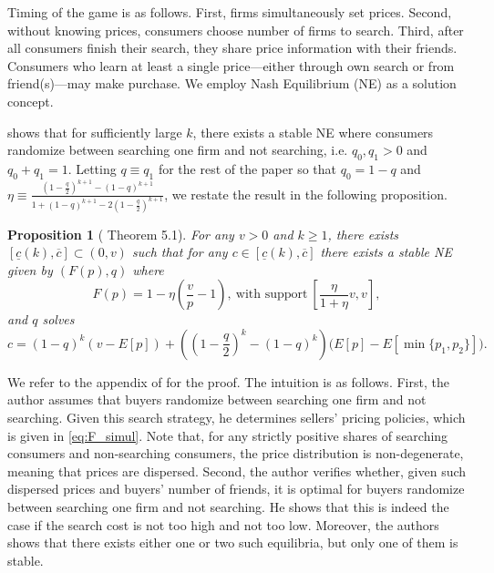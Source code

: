 \documentclass[12pt]{article}
\newtheorem{proposition}{Proposition}
\begin{document}
Timing of the game is as follows. First, firms simultaneously 
set prices.  Second, without knowing prices, consumers choose 
number of firms to search.  Third, after all consumers finish 
their search, they share price information with their friends.  
Consumers who learn at least a single price---either through own 
search or from friend(s)---may make purchase.  We employ 
Nash Equilibrium (NE) as a solution concept.

\cite{galeotti2004} shows that for sufficiently large $k$, there 
exists a stable NE where consumers randomize between 
searching one firm and not searching, i.e. $q_0, q_1>0$ and 
$q_0+q_1=1$.  Letting $q \equiv q_1$ for the rest of the paper 
so that $q_0=1-q$ and $\eta \equiv 
\frac{\left(1-\frac{q}{2}\right)^{k+1} - (1-q)^{k+1}}{1 + 
(1-q)^{k+1} - 2 \left(1-\frac{q}{2}\right)^{k+1}}$, we restate 
the result in the following proposition.
\begin{proposition}[\cite{galeotti2004} Theorem 5.1]\label{prop:simul_eq}
	For any $v>0$ and $k\geq 1$, there exists 
	$[\underline{c}(k),\overline{c}]\subset (0,v)$ such that for 
	any $c \in 	[\underline{c}(k), \overline{c}]$ there 
	exists a stable NE given by $(F(p), q)$ where
	\begin{equation}\label{eq:F_simul}
	F(p) = 1 - \eta \left(\frac{v}{p}-1\right), \ \mbox{with support} \ 
	\left[\frac{\eta}{1 +  
		\eta}v,v\right],
	\end{equation}
	 and $q$ solves
	 \begin{equation}\label{eq:IC_simul}
	 c = (1-q)^k(v-E[p]) + \left(\left(1-\frac{q}{2}\right)^k - 
	 (1-q)^k\right)\big(E[p] - E[\min\{p_1,p_2\}]\big).
	 \end{equation}
\end{proposition}

We refer to the appendix of \cite{galeotti2004} for the proof.  
The intuition is as follows.  First, the author assumes that 
buyers randomize between searching one firm and not searching.  
Given this search strategy, he determines sellers' pricing 
policies, which is given in \eqref{eq:F_simul}.  Note that, for 
any strictly positive shares of searching consumers and 
non-searching consumers, the price distribution is 
non-degenerate, meaning that prices are dispersed.  Second, the 
author verifies whether, given such dispersed prices and buyers' 
number of friends, it is optimal for buyers randomize between 
searching one firm and not searching.  He shows that this is 
indeed the case if the search cost is not too high and not too 
low.  Moreover, the authors shows that there exists either one 
or two such equilibria, but only one of them is stable.  
\end{document}
